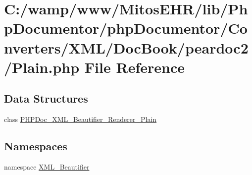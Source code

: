 \hypertarget{_plain_8php}{\section{\-C\-:/wamp/www/\-Mitos\-E\-H\-R/lib/\-Php\-Documentor/php\-Documentor/\-Converters/\-X\-M\-L/\-Doc\-Book/peardoc2/\-Plain.php \-File \-Reference}
\label{_plain_8php}
}
\subsection*{\-Data \-Structures}
\begin{DoxyCompactItemize}
\item 
class \hyperlink{class_p_h_p_doc___x_m_l___beautifier___renderer___plain}{\-P\-H\-P\-Doc\-\_\-\-X\-M\-L\-\_\-\-Beautifier\-\_\-\-Renderer\-\_\-\-Plain}
\end{DoxyCompactItemize}
\subsection*{\-Namespaces}
\begin{DoxyCompactItemize}
\item 
namespace \hyperlink{namespace_x_m_l___beautifier}{\-X\-M\-L\-\_\-\-Beautifier}
\end{DoxyCompactItemize}

